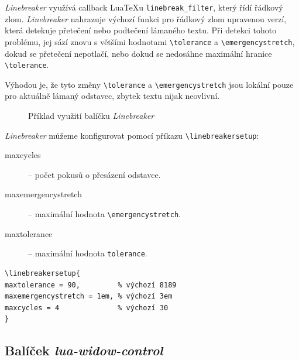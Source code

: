 \documentclass{csbulletin}
\newcommand\balicek[1]{\textit{#1}}
\begin{document}
\balicek{Linebreaker} využívá callback Lua\TeX u \verb|linebreak_filter|, který řídí řádkový zlom.
\balicek{Linebreaker} nahrazuje výchozí funkci pro řádkový zlom upravenou
verzí, která detekuje přetečení nebo podtečení lámaného textu. Při detekci
tohoto problému, jej sází znovu s většími hodnotami \verb|\tolerance| a
\verb|\emergencystretch|, dokud se přetečení nepotlačí, nebo dokud se nedosáhne
maximální hranice \verb|\tolerance|.

Výhodou je, že tyto změny \verb|\tolerance| a \verb|\emergencystretch| jsou lokální pouze 
pro aktuálně lámaný odstavec, zbytek textu nijak neovlivní. 


\begin{figure}
  \caption{Příklad využití balíčku \balicek{Linebreaker}}
  \label{fig:linebreaker}
\end{figure}


\balicek{Linebreaker} můžeme konfigurovat pomocí příkazu \verb|\linebreakersetup|:
  \begin{description}
    \item[maxcycles] – počet pokusů o přesázení odstavce.
    \item[maxemergencystretch] – maximální hodnota \verb|\emergencystretch|.
    \item[maxtolerance] – maximální hodnota \verb|tolerance|.
  \end{description}

\begin{verbatim}
\linebreakersetup{
maxtolerance = 90,         % výchozí 8189
maxemergencystretch = 1em, % výchozí 3em
maxcycles = 4              % výchozí 30
}
\end{verbatim}

\subsection{Balíček \balicek{lua-widow-control}}
\end{document}
